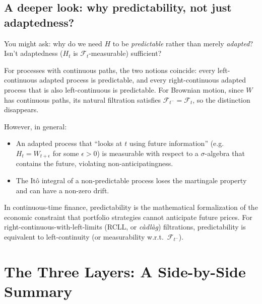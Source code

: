 \documentclass[11pt,a4paper]{article}
\theoremstyle{definition}
\theoremstyle{plain}
\theoremstyle{remark}
\newcommand{\F}{\mathcal{F}}
\begin{document}
\subsection{A deeper look: why predictability, not just adaptedness?}

You might ask: why do we need $H$ to be \emph{predictable} rather than merely \emph{adapted}? Isn't adaptedness ($H_t$ is $\F_t$-measurable) sufficient?

For processes with continuous paths, the two notions coincide: every left-continuous adapted process is predictable, and every right-continuous adapted process that is also left-continuous is predictable. For Brownian motion, since $W$ has continuous paths, its natural filtration satisfies $\F_{t^-} = \F_t$, so the distinction disappears.

However, in general:
\begin{itemize}
  \item An adapted process that ``looks at $t$ using future information'' (e.g.\ $H_t = W_{t+\epsilon}$ for some $\epsilon > 0$) is measurable with respect to a $\sigma$-algebra that contains the future, violating non-anticipatingness.
  \item The Itô integral of a non-predictable process loses the martingale property and can have a non-zero drift.
\end{itemize}

In continuous-time finance, predictability is the mathematical formalization of the economic constraint that portfolio strategies cannot anticipate future prices. For right-continuous-with-left-limits (RCLL, or \emph{càdlàg}) filtrations, predictability is equivalent to left-continuity (or measurability w.r.t.\ $\F_{t^-}$).

\section{The Three Layers: A Side-by-Side Summary}
\label{sec:summary-table}
\end{document}

